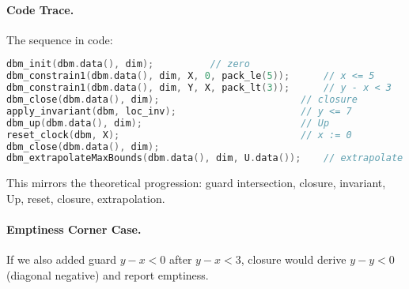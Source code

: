 \paragraph{Code Trace.} The sequence in code:
\begin{lstlisting}[language=C++]
dbm_init(dbm.data(), dim);          // zero
dbm_constrain1(dbm.data(), dim, X, 0, pack_le(5));      // x <= 5
dbm_constrain1(dbm.data(), dim, Y, X, pack_lt(3));      // y - x < 3
dbm_close(dbm.data(), dim);                         // closure
apply_invariant(dbm, loc_inv);                      // y <= 7
dbm_up(dbm.data(), dim);                            // Up
reset_clock(dbm, X);                                // x := 0
dbm_close(dbm.data(), dim);
dbm_extrapolateMaxBounds(dbm.data(), dim, U.data());    // extrapolate
\end{lstlisting}
This mirrors the theoretical progression: guard intersection, closure, invariant, Up, reset, closure, extrapolation.

\paragraph{Emptiness Corner Case.} If we also added guard $y - x < 0$ after $y - x < 3$, closure would derive $y - y < 0$ (diagonal negative) and report emptiness.
